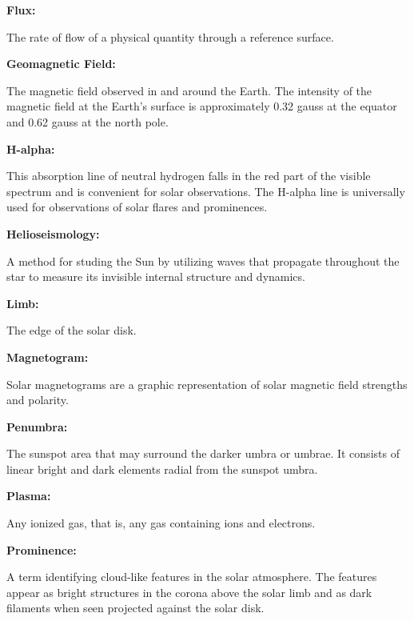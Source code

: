 \textbf{Flux:}
\begin{myindentpar}{1cm}
  The rate of flow of a physical quantity through a reference surface.
\end{myindentpar}

\textbf{Geomagnetic Field:}
\begin{myindentpar}{1cm}
  The magnetic field observed in and around the Earth. The intensity of the magnetic field at the Earth's surface is approximately 0.32 gauss at the equator and 0.62 gauss at the north pole.
\end{myindentpar}

\textbf{H-alpha:}
\begin{myindentpar}{1cm}
  This absorption line of neutral hydrogen falls in the red part of the visible spectrum and is convenient for solar observations. The H-alpha line is universally used for observations of solar flares and prominences.
\end{myindentpar}

\textbf{Helioseismology:}
\begin{myindentpar}{1cm}
  A method for studing the Sun by utilizing waves that propagate throughout the star to measure its invisible internal structure and dynamics.
\end{myindentpar}

\textbf{Limb:}
\begin{myindentpar}{1cm}
  The edge of the solar disk.
\end{myindentpar}

\textbf{Magnetogram:}
\begin{myindentpar}{1cm}
  Solar magnetograms are a graphic representation of solar magnetic field strengths and polarity.
\end{myindentpar}

\textbf{Penumbra:}
\begin{myindentpar}{1cm}
  The sunspot area that may surround the darker umbra or umbrae. It consists of linear bright and dark elements radial from the sunspot umbra.
\end{myindentpar}

\textbf{Plasma:}
\begin{myindentpar}{1cm}
  Any ionized gas, that is, any gas containing ions and electrons.
\end{myindentpar}

\textbf{Prominence:}
\begin{myindentpar}{1cm}
  A term identifying cloud-like features in the solar atmosphere. The features appear as bright structures in the corona above the solar limb and as dark filaments when seen projected against the solar disk.
\end{myindentpar}

